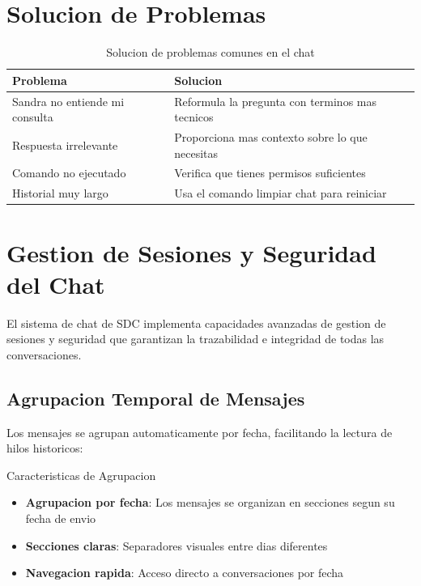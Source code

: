 \section{Solucion de Problemas}
\label{sec:solucion-problemas-chat}

\begin{table}[H]
\centering
\begin{tabular}{p{5cm}p{7cm}}
\toprule
\textbf{Problema} & \textbf{Solucion} \\
\midrule
Sandra no entiende mi consulta & Reformula la pregunta con terminos mas tecnicos \\
\midrule
Respuesta irrelevante & Proporciona mas contexto sobre lo que necesitas \\
\midrule
Comando no ejecutado & Verifica que tienes permisos suficientes \\
\midrule
Historial muy largo & Usa el comando limpiar chat para reiniciar \\
\bottomrule
\end{tabular}
\caption{Solucion de problemas comunes en el chat}
\label{tab:problemas-chat}
\end{table}

\section{Gestion de Sesiones y Seguridad del Chat}
\label{sec:gestion-sesiones}

El sistema de chat de SDC implementa capacidades avanzadas de gestion de sesiones y seguridad que garantizan la trazabilidad e integridad de todas las conversaciones.


\subsection{Agrupacion Temporal de Mensajes}

Los mensajes se agrupan automaticamente por fecha, facilitando la lectura de hilos historicos:

\begin{caja}{Caracteristicas de Agrupacion}
\begin{itemize}
\item \textbf{Agrupacion por fecha}: Los mensajes se organizan en secciones segun su fecha de envio
\item \textbf{Secciones claras}: Separadores visuales entre dias diferentes
\item \textbf{Navegacion rapida}: Acceso directo a conversaciones por fecha
\end{itemize}
\end{caja}

